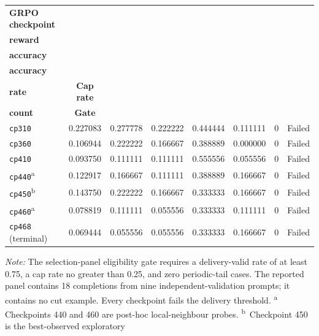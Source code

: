 \begin{table}[htbp]
    \centering
    \scriptsize
    \setlength{\tabcolsep}{3.5pt}
    \renewcommand{\arraystretch}{1.15}
    \begin{tabular}{@{}lccccccc@{}}
        \toprule
        \textbf{GRPO checkpoint} &
        \makecell{\textbf{Mean}\\\textbf{reward}} &
        \makecell{\textbf{Direction}\\\textbf{accuracy}} &
        \makecell{\textbf{Exact-action}\\\textbf{accuracy}} &
        \makecell{\textbf{Delivery-valid}\\\textbf{rate}} &
        \textbf{Cap rate} &
        \makecell{\textbf{Periodic-tail}\\\textbf{count}} &
        \textbf{Gate} \\
        \midrule
        \texttt{cp310} & 0.227083 & 0.277778 & 0.222222 & 0.444444 & 0.111111 & 0 & Failed \\
        \texttt{cp360} & 0.106944 & 0.222222 & 0.166667 & 0.388889 & 0.000000 & 0 & Failed \\
        \texttt{cp410} & 0.093750 & 0.111111 & 0.111111 & 0.555556 & 0.055556 & 0 & Failed \\
        \texttt{cp440}\textsuperscript{a} & 0.122917 & 0.166667 & 0.111111 & 0.388889 & 0.166667 & 0 & Failed \\
        \texttt{cp450}\textsuperscript{b} & 0.143750 & 0.222222 & 0.166667 & 0.333333 & 0.166667 & 0 & Failed \\
        \texttt{cp460}\textsuperscript{a} & 0.078819 & 0.111111 & 0.055556 & 0.333333 & 0.111111 & 0 & Failed \\
        \texttt{cp468} (terminal) & 0.069444 & 0.055556 & 0.055556 & 0.333333 & 0.166667 & 0 & Failed \\
        \bottomrule
    \end{tabular}
    \begin{minipage}{0.97\textwidth}
        \vspace{2pt}
        \footnotesize
        \textit{Note:} The selection-panel eligibility gate requires a
        delivery-valid rate of at least 0.75, a cap rate no greater than 0.25,
        and zero periodic-tail cases. The reported panel contains 18 completions
        from nine independent-validation prompts; it contains no cut example.
        Every checkpoint fails the delivery threshold. \textsuperscript{a}
        Checkpoints 440 and 460 are post-hoc local-neighbour probes.
        \textsuperscript{b}\ Checkpoint 450 is the best-observed exploratory

\end{minipage}
\end{table}
